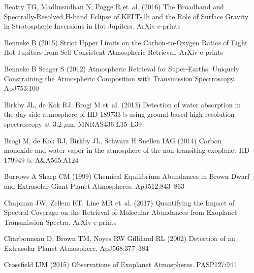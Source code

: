 \documentclass[graybox,natbib,nosecnum]{svmult}
\newcommand*\aap{A\&A}
\newcommand*\apj{ApJ}
\newcommand*\mnras{MNRAS}
\newcommand*\pasp{PASP}
\begin{document}
\begin{thebibliography}{110}
{Beatty} TG, {Madhusudhan} N, {Pogge} R et~al. (2016) {The Broadband and
  Spectrally-Resolved H-band Eclipse of KELT-1b and the Role of Surface Gravity
  in Stratospheric Inversions in Hot Jupiters}. ArXiv e-prints

{Benneke} B (2015) {Strict Upper Limits on the Carbon-to-Oxygen Ratios of Eight
  Hot Jupiters from Self-Consistent Atmospheric Retrieval}. ArXiv e-prints

{Benneke} B {Seager} S (2012) {Atmospheric Retrieval for Super-Earths: Uniquely
  Constraining the Atmospheric Composition with Transmission Spectroscopy}.
  \apj 753:100

{Birkby} JL, {de Kok} RJ, {Brogi} M et~al. (2013) {Detection of water
  absorption in the day side atmosphere of HD 189733 b using ground-based
  high-resolution spectroscopy at 3.2 {$\mu$}m}. \mnras 436:L35--L39

{Brogi} M, {de Kok} RJ, {Birkby} JL, {Schwarz} H {Snellen} IAG (2014) {Carbon
  monoxide and water vapor in the atmosphere of the non-transiting exoplanet HD
  179949 b}. \aap 565:A124

{Burrows} A {Sharp} CM (1999) {Chemical Equilibrium Abundances in Brown Dwarf
  and Extrasolar Giant Planet Atmospheres}. \apj 512:843--863

{Chapman} JW, {Zellem} RT, {Line} MR et~al. (2017) {Quantifying the Impact of
  Spectral Coverage on the Retrieval of Molecular Abundances from Exoplanet
  Transmission Spectra}. ArXiv e-prints

{Charbonneau} D, {Brown} TM, {Noyes} RW {Gilliland} RL (2002) {Detection of an
  Extrasolar Planet Atmosphere}. \apj 568:377--384

{Crossfield} IJM (2015) {Observations of Exoplanet Atmospheres}. \pasp 127:941


\end{thebibliography}
\end{document}
